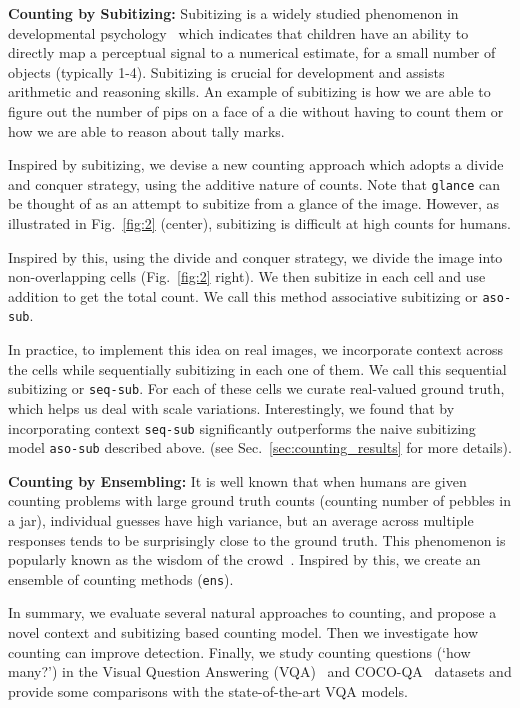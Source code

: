 \documentclass[10pt,twocolumn,letterpaper]{article}
\newcommand{\sub}{\texttt{aso-sub}\xspace}
\newcommand{\seq}{\texttt{seq-sub}\xspace}
\newcommand{\glance}{\texttt{glance}\xspace}
\newcommand{\ens}{\texttt{ens}\xspace}
\begin{document}
\noindent \textbf{Counting by Subitizing:} Subitizing is a widely studied phenomenon in developmental psychology~\cite{clements1999subitizing,Klein88,CutiniS} which indicates that children have an ability to directly map a perceptual signal to a numerical estimate, for a small number of objects (typically 1-4). Subitizing is crucial for development and assists arithmetic and reasoning skills. An example of subitizing is how we are able to figure out the number of pips on a face of a die without having to count them or how we are able to reason about tally marks.

Inspired by subitizing, we devise a new counting approach which adopts a divide and conquer strategy, using the additive nature of counts.
Note that \glance can be thought of as an attempt to subitize from a glance of the image. However, as illustrated in Fig.~\ref{fig:2} (center), subitizing is difficult at high counts for humans.


Inspired by this, using the divide and conquer strategy, we divide the image into non-overlapping cells (Fig.~\ref{fig:2} right). We then subitize in each cell and use addition to get the total count. We call this method associative subitizing or \sub.


In practice, to implement this idea on real images, we incorporate context across the cells while sequentially subitizing in each one of them. We call this sequential subitizing or \seq{}. For each of these cells we curate real-valued ground truth, which helps us deal with scale variations.
Interestingly, we found that by incorporating context \seq significantly outperforms the naive subitizing model \sub described above. 
(see Sec.~\ref{sec:counting_results} for more details).









\noindent \textbf{Counting by Ensembling:} It is well known that when humans are given counting problems with large ground truth counts (\eg counting number of pebbles in a jar), individual guesses have high variance, but an average across multiple responses tends to be surprisingly close to the ground truth. This phenomenon is popularly known as the wisdom of the crowd~\cite{Galton}.
Inspired by this, we create an ensemble of counting methods (\ens).


In summary, we evaluate several natural approaches to counting, and propose a novel context and subitizing based counting model. Then we investigate how counting can improve detection. Finally, we study counting questions (`how many?') in the Visual Question Answering (VQA)~\cite{vqa} and COCO-QA~\cite{Ren2015ExploringAnswering} datasets and provide some comparisons with the state-of-the-art VQA models.
\end{document}
